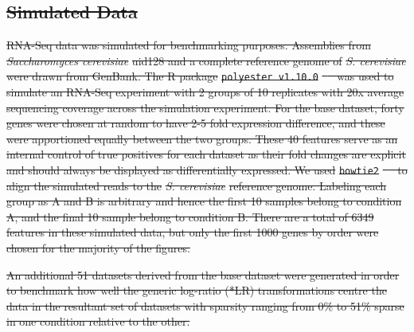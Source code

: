 \documentclass[graybox]{svmult}
\providecommand{\DIFdel}[1]{{\protect\color{red}\sout{#1}}}                      %
\providecommand{\DIFdelbegin}{} %
\begin{document}
\DIFdelbegin \subsection*{\DIFdel{Simulated Data}}
\DIFdel{RNA-Seq data was simulated for benchmarking purposes. Assemblies from }\textit{\DIFdel{Saccharomyces cerevisiae}} %
\DIFdel{uid128 and  a complete reference genome of }\textit{\DIFdel{S. cerevisiae}} %
\DIFdel{were drawn from GenBank. The R package }\texttt{\DIFdel{polyester v1.10.0}} %
\DIFdel{\mbox{%
\cite{polyester:2016} }%
was used to simulate an RNA-Seq experiment with 2 groups of 10 replicates with 20x average sequencing coverage across the simulation experiment. For the base dataset, forty genes were chosen at random to have 2-5 fold expression difference, and these were apportioned equally between the two groups. These 40 features serve as an internal control of true positives for each dataset as their fold changes are explicit and should always be displayed as differentially expressed. We used }\texttt{\DIFdel{bowtie2}} %
\DIFdel{\mbox{%
\cite{bowtie2} }%
to align the simulated reads  to the }\textit{\DIFdel{S. cerevisiae}} %
\DIFdel{reference genome. Labeling each group as A and B is arbitrary and hence the first 10 samples belong to condition A, and the final 10 sample belong to condition B. There are a total of 6349 features in these simulated data, but only the first 1000 genes by order were chosen for the majority of the figures. 
}%

\DIFdel{An additional 51 datasets derived from the base dataset were generated in order to benchmark how well the generic log-ratio (*LR) transformations centre the data in the resultant set of datasets with sparsity ranging from 0\% to 51\% sparse in one condition relative to the other. 
}%
\end{document}
